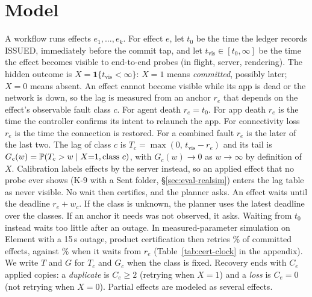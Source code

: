 \section{Model}
\label{sec:model}

A workflow runs effects $e_1,\dots,e_k$. For effect $e$, let $t_0$ be the time the ledger records \textsf{ISSUED}, immediately before the commit tap,
and let $t_{\mathrm{vis}}\in[t_0,\infty]$ be the time the effect becomes visible to end-to-end probes (in flight, server, rendering).
The hidden outcome is $X=\mathbf 1\{t_{\mathrm{vis}}<\infty\}$: $X{=}1$ means \emph{committed}, possibly later; $X{=}0$ means absent.
An effect cannot become visible while its app is dead or the network is down, so the lag is measured from an anchor $r_e$ that depends on the
effect's observable fault class $c$. For agent death $r_e=t_0$. For app death $r_e$ is the time the controller confirms its intent to relaunch the app. For connectivity loss
$r_e$ is the time the connection is restored. For a combined fault $r_e$ is the later of the last two. The lag of class $c$ is $T_c=\max(0,\,t_{\mathrm{vis}}-r_e)$ and its tail is
$G_c(w)=\mathbb{P}(T_c>w\mid X{=}1,\text{class }c)$, with $G_c(w)\to0$ as $w\to\infty$ by definition of $X$. Calibration labels effects by the server instead, so an applied effect that no probe ever shows (K-9 with a Sent
folder, \S\ref{sec:eval-realsim}) enters the lag table as never visible. No wait then certifies, and the planner asks. An effect waits until the deadline $r_e+w_c$.
If the class is unknown, the planner uses the latest deadline over the classes. If an anchor it needs was not observed, it asks.
Waiting from $t_0$ instead waits too little after an outage. In measured-parameter simulation on Element with a 15\,s outage, product certification then retries
\CertClockTzeroDownFifteenProdPv\% of committed effects, against \CertClockDownFifteenProdPv\% when it waits from $r_e$ (Table~\ref{tab:cert-clock} in the appendix).
We write $T$ and $G$ for $T_c$ and $G_c$ when the class is fixed. Recovery ends with $C_e$ applied copies: a \emph{duplicate} is $C_e\ge2$
(retrying when $X{=}1$) and a \emph{loss} is $C_e=0$ (not retrying when $X{=}0$). Partial effects are modeled as several effects.

